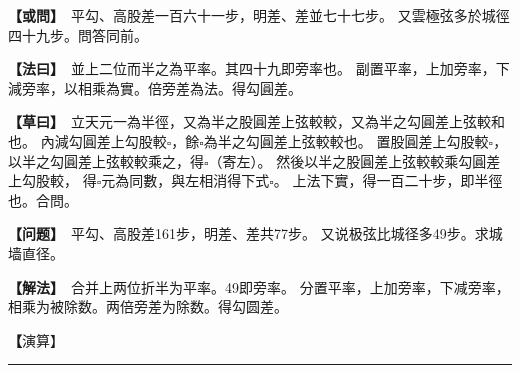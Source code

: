 \documentclass[11pt,a4paper]{article}
\let\origsquare\square
\renewcommand{\square}{\ensuremath{\origsquare}}%
\newcommand{\longline}{\noindent\rule{\textwidth}{0.4pt}}
\newcommand{\clOWEN}[1]{%
  \par\vspace{0.3em}%
  \noindent\textcolor{problemcolor}{\textbf{【或問】}}\,{\tradfont #1}\par\nopagebreak%
}
\newcommand{\mdOWEN}[1]{%
  \par\vspace{0.3em}%
  \noindent\textcolor{problemcolor}{\textbf{【问题】}}\,{\modfont #1}\par\nopagebreak%
}
\newcommand{\clFAYUE}[1]{%
  \par\noindent\textcolor{methodcolor}{\textbf{【法曰】}}\,{\tradfont #1}\par\nopagebreak%
}
\newcommand{\mdFAYUE}[1]{%
  \par\noindent\textcolor{methodcolor}{\textbf{【解法】}}\,{\modfont #1}\par\nopagebreak%
}
\newcommand{\clTSAOYUE}[1]{%
  \par\noindent\textcolor{workcolor}{\textbf{【草曰】}}\,{\tradfont #1}\par%
}
\newcommand{\mdTSAOYUE}[1]{%
  \par\noindent\textcolor{workcolor}{\textbf【演算】}}\,{\modfont #1}\par%
\begin{document}
\begin{paracol}{2}

\begin{leftcolumn}
\clOWEN{%
平勾、高股差一百六十一步，明差、差並七十七步。
又雲極弦多於城徑四十九步。問答同前。}

\clFAYUE{%
並上二位而半之為平率。其四十九即旁率也。
副置平率，上加旁率，下減旁率，以相乘為實。倍旁差為法。得勾圓差。}

\clTSAOYUE{%
立天元一為半徑，又為半之股圓差上弦較較，又為半之勾圓差上弦較和也。
內減勾圓差上勾股較$\square$，餘$\square$為半之勾圓差上弦較較也。
置股圓差上勾股較$\square$，以半之勾圓差上弦較較乘之，得$\square$（寄左）。
然後以半之股圓差上弦較較乘勾圓差上勾股較，
得$\square$元為同數，與左相消得下式$\square$。
上法下實，得一百二十步，即半徑也。合問。}
\end{leftcolumn}

\switchcolumn

\begin{rightcolumn}
\mdOWEN{%
平勾、高股差161步，明差、差共77步。
又说极弦比城径多49步。求城墙直径。}

\mdFAYUE{%
合并上两位折半为平率。49即旁率。
分置平率，上加旁率，下减旁率，相乘为被除数。两倍旁差为除数。得勾圆差。}

\mdTSAOYUE{%
设天元一为半径，又为半之股圆差上弦较较，又为半之勾圆差上弦较和。
减去勾圆差上勾股较$\square$，余$\square$为半之勾圆差上弦较较。
取股圆差上勾股较$\square$，以半之勾圆差上弦较较乘之，得$\square$（寄左）。
然后以半之股圆差上弦较较乘勾圆差上勾股较，
得$\square$元为同数，与左式相消得下式$\square$。
上法下实，得120步，即半径。符合所问。}
\end{rightcolumn}

\end{paracol}

\vspace{0.3cm}
\begin{center}\longline\end{center}
\end{document}
